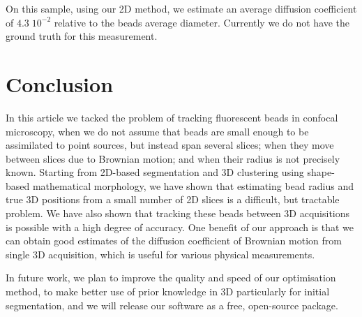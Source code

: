 \documentclass{llncs}
\begin{document}
On this sample, using our 2D method, we estimate an average diffusion coefficient of $4.3\;10^{-2}$ relative to the beads average diameter. Currently we do not have the ground truth for this measurement. 

\section{Conclusion}\label{sec:Conclusion}
In this article we tacked the problem of tracking fluorescent beads in 
confocal microscopy, when we do not assume that beads are small enough to be assimilated to point sources, but instead span several slices; when they move between slices due to Brownian motion; and when their radius is not precisely known. Starting from 2D-based segmentation and 3D clustering using shape-based mathematical morphology, we have shown that estimating bead radius and true 3D positions from a small number of 2D slices is a difficult, but tractable problem. We have also shown that tracking these beads between 3D acquisitions is possible with a high degree of accuracy. One benefit of our approach is that we can obtain good estimates of the diffusion coefficient of Brownian motion from single 3D acquisition, which is useful for various physical measurements.

In future work, we plan to improve the quality and speed of our optimisation method, to make better use of prior knowledge in 3D particularly for initial segmentation, and we will release our software as a free, open-source package.



\end{document}
